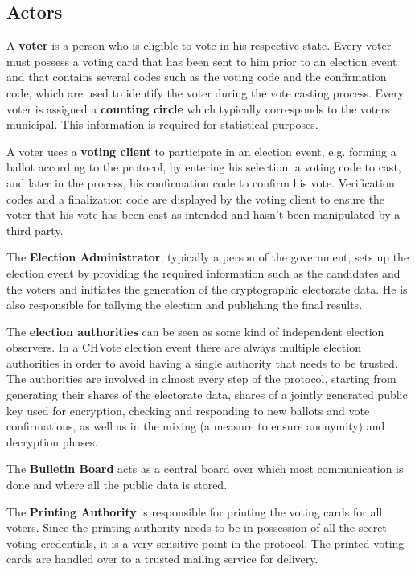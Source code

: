 \subsection{Actors}
A \textbf{voter} is a person who is eligible to vote in his respective state. Every voter must possess a voting card that has been sent to him prior to an election event and that contains several codes such as the voting code and the confirmation code, which are used to identify the voter during the vote casting process. Every voter is assigned a \textbf{counting circle} which typically corresponds to the voters municipal. This information is required for statistical purposes. 

A voter uses a \textbf{voting client} to participate in an election event, e.g. forming a ballot according to the protocol, by entering his selection, a voting code to cast, and later in the process, his confirmation code to confirm his vote. Verification codes and a finalization code are displayed by the voting client to ensure the voter that his vote has been cast as intended and hasn't been manipulated by a third party.

The \textbf{Election Administrator}, typically a person of the government, sets up the election event by providing the required information such as the candidates and the voters and initiates the generation of the cryptographic electorate data. He is also responsible for tallying the election and publishing the final results.

The \textbf{election authorities} can be seen as some kind of independent election observers. In a CHVote election event there are always multiple election authorities in order to avoid having a single authority that needs to be trusted. The authorities are involved in almost every step of the protocol, starting from generating their shares of the electorate data, shares of a jointly generated public key used for encryption, checking and responding to new ballots and vote confirmations, as well as in the mixing (a measure to ensure anonymity) and decryption phases.

The \textbf{Bulletin Board} acts as a central board over which most communication is done and where all the public data is stored.

The \textbf{Printing Authority} is responsible for printing the voting cards for all voters. Since the printing authority needs to be in possession of all the secret voting credentials, it is a very sensitive point in the protocol. The printed voting cards are handled over to a trusted mailing service for delivery.

